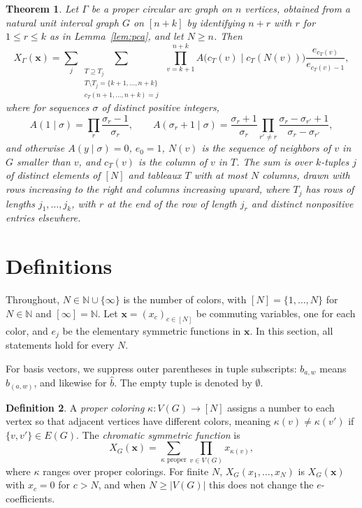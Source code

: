 \documentclass[12pt]{article}
\theoremstyle{plain}
\newtheorem{theorem}{Theorem}
\theoremstyle{definition}
\newtheorem{definition}[theorem]{Definition}
\theoremstyle{remark}
\newcommand{\bN}{\mathbb{N}}
\begin{document}
\begin{theorem}\label{thm:pca-formula}
Let $\Gamma$ be a proper circular arc graph on $n$ vertices, obtained from
a natural unit interval graph $G$ on $[n+k]$ by identifying $n+r$ with $r$
for $1\le r\le k$ as in Lemma~\ref{lem:pca}, and let $N\ge n$. Then
\[
X_\Gamma(\bm x)=\sum_j\sum_{\substack{T\supseteq T_j\\
 T\setminus T_j=\{k+1,\dots,n+k\}\\ c_T(n+1,\dots,n+k)=j}}\
 \prod_{v=k+1}^{n+k}
 A\bigl(c_T(v)\mid c_T(N(v))\bigr)\frac{e_{c_T(v)}}{e_{c_T(v)-1}},
\]
where for sequences $\sigma$ of distinct positive integers,
\[
A(1\mid\sigma)=\prod_r\frac{\sigma_r-1}{\sigma_r},\qquad
A(\sigma_r+1\mid\sigma)=\frac{\sigma_r+1}{\sigma_r}\prod_{r'\ne r}\frac{\sigma_r-\sigma_{r'}+1}{\sigma_r-\sigma_{r'}},
\]
and otherwise $A(y\mid\sigma)=0$, $e_0=1$, $N(v)$ is the sequence of
neighbors of $v$ in $G$ smaller than $v$, and $c_T(v)$ is the column of
$v$ in $T$. The sum is over $k$-tuples $j$ of distinct elements of $[N]$
and tableaux $T$ with at most $N$ columns, drawn with rows increasing to
the right and columns increasing upward, where $T_j$ has rows of lengths
$j_1,\dots,j_k$, with $r$ at the end of the row of length $j_r$ and
distinct nonpositive entries elsewhere.
\end{theorem}



\section{Definitions}\label{section:defs}

Throughout, $N\in\bN\cup\{\infty\}$ is the number of colors, with $[N]=\{1,\ldots,N\}$ for $N\in\bN$ and $[\infty]=\bN$. Let $\bm x=(x_c)_{c\in[N]}$ be commuting variables, one for each color, and $e_j$ be the elementary symmetric functions in $\bm x$. In this section, all statements hold for every $N$.

For basis vectors, we suppress outer parentheses in tuple subscripts: $b_{a,w}$ means $b_{(a,w)}$, and likewise for $\hat b$. The empty tuple is denoted by $\emptyset$.

\begin{definition}
    A \emph{proper coloring} $\kappa: V(G) \to [N]$ assigns a number to each vertex so that adjacent vertices have different colors, meaning $\kappa(v) \neq \kappa(v')$ if $\{v, v'\}\in E(G)$. The \emph{chromatic symmetric function} \cite[Definition 2.1]{chromsym} is
    \[X_G(\bm x)=\sum_{\kappa \text{ proper}}\prod_{v\in V(G)}x_{\kappa(v)},\]
    where $\kappa$ ranges over proper colorings. For finite $N$, $X_G(x_1,\dots,x_N)$ is $X_G(\bm x)$ with $x_c=0$ for $c>N$, and when $N\ge|V(G)|$ this does not change the $e$-coefficients.
\end{definition}
\end{document}
